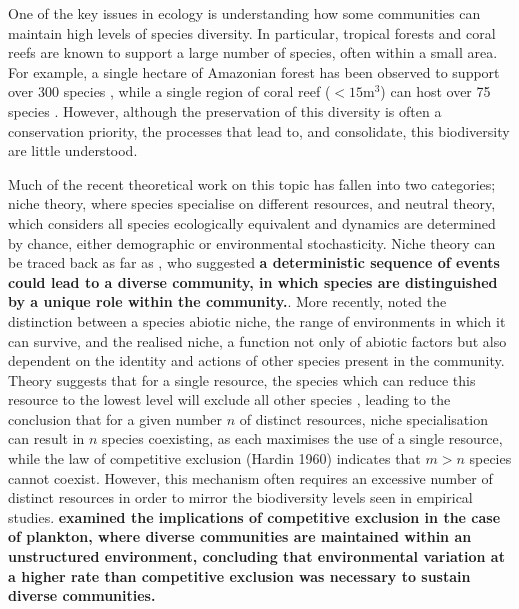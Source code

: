 One of the key issues in ecology is understanding how some communities can maintain high levels of species diversity. In particular, tropical forests and coral reefs are known to support a large number of species, often within a small area. For example, a single hectare of Amazonian forest has been observed to support over 300 species \citep{valencia1994high}, while a single region of coral reef ($<15$m$^3$) can host over 75 species \citep{smith1972space}. However, although the preservation of this diversity is often a conservation priority, the processes that lead to, and consolidate, this biodiversity are little understood.

Much of the recent theoretical work on this topic has fallen into two categories; niche theory, where species specialise on different resources, and neutral theory, which considers all species ecologically equivalent and dynamics are determined by chance, either demographic or environmental stochasticity. Niche theory can be traced back as far as \citep{darwinorigin}, who suggested \textbf{a deterministic sequence of events could lead to a diverse community, in which species are distinguished by a unique role within the community.}. More recently, \cite{hutchinson1957concluding} noted the distinction between a species abiotic niche, the range of environments in which it can survive, and the realised niche, a function not only of abiotic factors but also dependent on the identity and actions of other species present in the community. Theory suggests that for a single resource, the species which can reduce this resource to the lowest level will exclude all other species \citep[e.g.][]{tilman1980resources,tilman1991dynamics}, leading to the conclusion that for a given number $n$ of distinct resources, niche specialisation can result in $n$ species coexisting, as each maximises the use of a single resource, while the law of competitive exclusion (Hardin 1960) indicates that $m>n$ species cannot coexist. However, this mechanism often requires an excessive number of distinct resources in order to mirror the biodiversity levels seen in empirical studies. \textbf{\cite{hutchinson1961paradox} examined the implications of competitive exclusion  in the case of plankton, where diverse communities are maintained within an unstructured environment, concluding that environmental variation at a higher rate than competitive exclusion was necessary to sustain diverse communities.}

